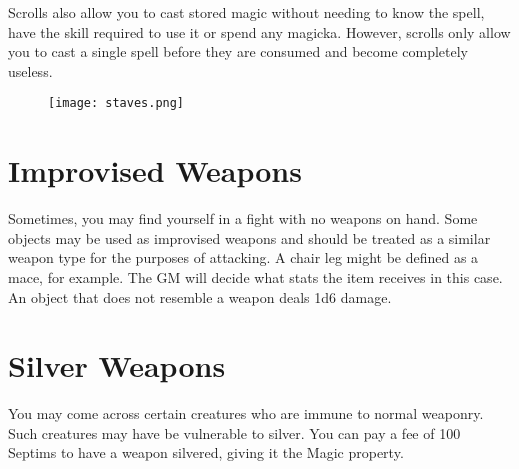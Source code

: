 Scrolls also allow you to cast stored magic without needing to know the spell, have the skill required to use it or spend any magicka. However, scrolls only allow you to cast a single spell before they are consumed and become completely useless.

\begin{figure}[h]
	\texttt{[image: staves.png]}
\end{figure}

\section{Improvised Weapons}
Sometimes, you may find yourself in a fight with no weapons on hand. Some objects may be used as improvised weapons and should be treated as a similar weapon type for the purposes of attacking. A chair leg might be defined as a mace, for example. The GM will decide what stats the item receives in this case. An object that does not resemble a weapon deals 1d6 damage.

\section{Silver Weapons}
You may come across certain creatures who are immune to normal weaponry. Such creatures may have be vulnerable to silver. You can pay a fee of 100 Septims to have a weapon silvered, giving it the Magic property.

